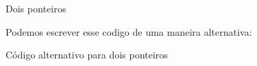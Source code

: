 \begin{frame}{Dois ponteiros}

    Podemos escrever esse codigo de uma maneira alternativa: \pause
    
    \begin{block}{Código alternativo para dois ponteiros}
        \footnotesize
        \inputminted{cpp}{codigos/twopointers2.cpp}    
    \end{block} 

    
\end{frame}

